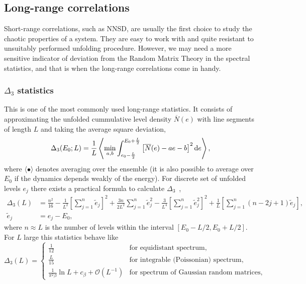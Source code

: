 \documentclass[a4paper,11pt,twoside]{article}
\begin{document}
    \subsection{Long-range correlations}
        Short-range correlations, such as NNSD, are usually the first choice to study the chaotic properties of a system.
        They are easy to work with and quite resistant to unsuitably performed unfolding procedure.
        However, we may need a more sensitive indicator of deviation from the Random Matrix Theory in the spectral statistics, and that is when the long-range correlations come in handy.

        \subsubsection{$\Delta_{3}$ statistics}
            This is one of the most commonly used long-range statistics.
            It consists of approximating the unfolded cummulative level density $\overline{N}(e)$ with line segments of length $L$ and taking the average square deviation,
            \begin{equation}
                \Delta_{3}(E_{0};L)
                =\frac{1}{L}\left\langle\min_{a,b}\int_{e_{0}-\frac{L}{2}}^{E_{0}+\frac{L}{2}}\left[\overline{N}(e)-ae-b\right]^{2}\mathrm{d} e\right\rangle,
            \end{equation}
            where $\langle\bullet\rangle$ denotes averaging over the ensemble (it is also possible to average over $E_{0}$ if the dynamics depends weakly of the energy).
            For discrete set of unfolded levels $e_{j}$ there exists a practical formula to calculate $\Delta_{3}$~\cite{Boh75},
            \begin{align}
                \Delta_{3}(L)
                    &=\frac{n^{2}}{16}-\frac{1}{L^{2}}\left[\sum_{j=1}^{n}\tilde{e}_{j}\right]^{2}+\frac{3n}{2L^{2}}\sum_{j=1}^{n}\tilde{e}_{j}^{2}-\frac{3}{L^{4}}\left[\sum_{j=1}^{n}\tilde{e}_{j}^{2}\right]^{2}+\frac{1}{L}\left[\sum_{j=1}^{n}\left(n-2j+1\right)\tilde{e}_{j}\right],\\
                \tilde{e}_{j}&=e_{j}-E_{0},\nonumber
            \end{align}
            where $n\approx L$ is the number of levels within the interval $[E_{0}-L/2,E_{0}+L/2]$.
            For $L$ large this statistics behave like
            \begin{equation}
                \Delta_{3}(L)=\left\{\begin{array}{ll}
                    \frac{1}{12} & \text{for equidistant spectrum},\\
                    \frac{L}{15} & \text{for integrable (Poissonian) spectrum},\\
                    \frac{1}{\pi^{2}\beta}\ln L+c_{\beta}+\mathcal{O}(L^{-1}) & \text{for spectrum of Gaussian random matrices},
                \end{array}\right.
                \label{eq:Delta3}
            \end{equation}
\end{document}

